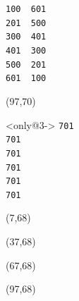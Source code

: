 \documentclass{beamer}
\begin{document}
\begin{frame}[fragile,t]
\begin{textblock}{20}
\begin{block}
    \scriptsize
    \verb:100  601:\\
    \verb:201  500:\\
    \verb:300  401:\\
    \verb:401  300:\\
    \verb:500  201:\\
    \verb:601  100:
    \vspace*{0.5ex}
    \end{block}
    \end{textblock}
    \begin{textblock}{20}(97,70)
    \begin{block}<only@3->{\vspace*{-3ex}}
    \scriptsize
    \verb:701:\\
    \verb:701:\\
    \verb:701:\\
    \verb:701:\\
    \verb:701:\\
    \verb:701:
    \vspace*{0.5ex}
    \end{block}
    \end{textblock}
    \begin{textblock}{20}(7,68)
    \end{textblock}
    \begin{textblock}{20}(37,68)
    \end{textblock}
    \begin{textblock}{20}(67,68)
    \end{textblock}
    \begin{textblock}{20}(97,68)
    \end{textblock}
\end{frame}
\end{document}
